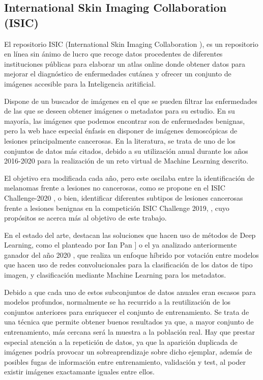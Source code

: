 \subsection{International Skin Imaging Collaboration​ (ISIC)}
El repositorio ISIC (International Skin Imaging Collaboration \cite{isicarchive}), es un repositorio en línea sin ánimo de lucro que recoge datos procedentes de diferentes instituciones públicas para elaborar un atlas online donde obtener datos para mejorar el diagnóstico de enfermedades cutánea y ofrecer un conjunto de imágenes accesible para la Inteligencia aritificial.

Dispone de un buscador de imágenes en el que se pueden filtrar las enfermedades de las que se deseen obtener imágenes o metadatos para su estudio. En su mayoría, las imágenes que podemos encontrar son de enfermedades benignas, pero la web hace especial énfasis en disponer de imágenes demoscópicas de lesiones principalmente cancerosas.  En la literatura, se trata de uno de los conjuntos de datos más citados, debido a su utilización anual durante los años 2016-2020 para la realización de un reto virtual de Machine Learning descrito. 

El objetivo era modificada cada año, pero este oscilaba entre la identificación de melanomas frente a lesiones no cancerosas, como se propone en el ISIC Challenge-2020 \cite{Rotemberg_2021}, o bien, identificar diferentes subtipos de lesiones cancerosas frente a lesiones benignas en la competición ISIC Challenge 2019, \cite{ham10000,codella2018skin,combalia2019bcn20000}, cuyo propósitos se acerca más al objetivo de este trabajo.

En el estado del arte, destacan las soluciones que hacen uso de métodos de Deep Learning, como el planteado por Ian Pan \cite{2ndISIC}] o el ya analizado anteriormente ganador del año 2020 \cite{1stISIC}, que realiza un enfoque híbrido por votación entre modelos que hacen uso de redes convolucionales para la clasificación de los datos de tipo imagen, y clasificación mediante Machine Learning para los metadatos.

Debido a que cada uno de estos subconjuntos de datos anuales eran escasos para modelos profundos, normalmente se ha recurrido a la reutilización de los conjuntos anteriores para enriquecer el conjunto de entrenamiento.  Se trata de una técnica que permite obtener buenos resultados ya que, a mayor conjunto de entrenamiento, más cercana será la muestra a la población real.  Hay que prestar especial atención a la repetición de datos, ya que la aparición duplicada de imágenes podría provocar un sobreaprendizaje sobre dicho ejemplar, además de posibles fugas de información entre entrenamiento, validación y test, al poder existir imágenes exactamante iguales entre ellos.

